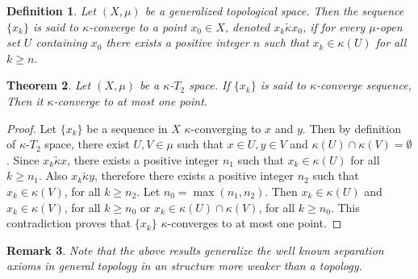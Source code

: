 \documentclass{matua}
\newtheorem{theorem}{Theorem}[section]
\newtheorem{definition}[theorem]{Definition}
\newtheorem{remark}[theorem]{Remark}
\begin{document}



\begin{definition}
Let $(X, \mu)$ be a generalized topological space. Then the sequence $\{x_k\}$ is said to $\kappa$-converge to a point $x_0 \in X$, denoted $x_k\underrightarrow{\kappa}x_0$, if for every $\mu$-open set $U$ containing $x_0$ there exists a positive
integer $n$ such that $x_k \in \kappa(U)$ for all $k\geq n$.
\end{definition}
\begin{theorem}
Let $(X, \mu)$ be a $\kappa$-$T_2$ space. If $\{x_k\}$ is said to $\kappa$-converge sequence, Then it $\kappa$-converge to at most one point.
\end{theorem}
\begin{proof}
Let $\{x_k\}$ be a sequence in $X$ $\kappa$-converging to $x$ and $y$. Then by definition
of $\kappa$-$T_2$ space, there exist $U, V\in \mu$ such that $x \in U , y\in V$ and $\kappa(U)\cap\kappa(V) = \emptyset$. Since $x_k\underrightarrow{\kappa}x$, there exists a positive integer $n_1$ such that $x_k\in \kappa(U)$ for all
$k\geq n_1$. Also $x_k\underrightarrow{\kappa}y$, therefore there exists a positive integer $n_2$ such that $x_k\in \kappa(V)$, for
all $k\geq n_2$. Let $n_0 = \max (n_1, n_2)$. Then $x_k\in \kappa(U)$ and $x_k\in\kappa(V)$, for all $k\geq n_0$ or $x_k\in \kappa(U)\cap\kappa(V)$, for all $k\geq n_0$. This contradiction proves that $\{x_k\}$ $\kappa$-converges to at most one point.
\end{proof}
\begin{remark}
Note that the above results generalize the well known separation axioms in general topology in an structure more weaker than a topology.
\end{remark}
\end{document}
